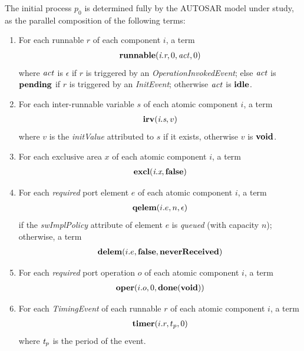 \documentclass[10pt,conference]{IEEEtran}
\begin{document}
The initial process $p_0$ is determined fully by the AUTOSAR model under study, as the parallel composition of the following terms:
\begin{enumerate}

\item For each runnable $r$ of each component $i$, a term
\[
\begin{array}{c}
  \Trunnable {\Tr r i} 0 \Act 0
\end{array}
\]
where $\Act$ is $\epsilon$ if $r$ is triggered by an \emph{OperationInvokedEvent}; else $\Act$ is $\Tpending$ if $r$ is triggered by an \emph{InitEvent}; otherwise $\Act$ is $\Tidle$.

\item For each inter-runnable variable $s$ of each atomic component $i$, a term
\[
\begin{array}{c}
  \Tirv {\Ts s i} v
\end{array}
\]
where $v$ is the \emph{initValue} attributed to $s$ if it exists, otherwise $v$ is $\Tvoid$.

\item For each exclusive area $x$ of each atomic component $i$, a term
\[
\begin{array}{c}
  \Texcl {\Tx x i} \Tfalse
\end{array}
\]

\item For each {\em required} port element $e$ of each atomic component $i$, a term
\[
\begin{array}{c}
  \Tqelem {i.e} n \epsilon
\end{array}
\]
if the \emph{swImplPolicy} attribute of element $e$ is \emph{queued} (with capacity $n$); otherwise, a term
\[
\begin{array}{c}
  \Tdelem {i.e} \Tfalse \TneverReceived
\end{array}
\]

\item For each {\em required} port operation $o$ of each atomic component $i$, a term
\[
\begin{array}{c}
  \Toper{i.o} 0 {\Tdone \Tvoid}
\end{array}
\]

\item For each \emph{TimingEvent} of each runnable $r$ of each atomic component $i$, a term
\[
\begin{array}{c}
  \Ttimer {i.r} {t_p} 0
\end{array}
\]
where $\V{T_p}$ is the period of the event.

\end{enumerate}
\end{document}
